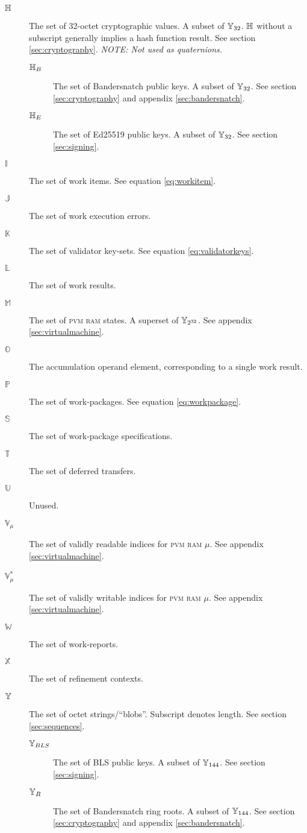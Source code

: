 \begin{description}
  \item[$\mathbb{H}$] The set of 32-octet cryptographic values. A subset of $\mathbb{Y}_{32}$. $\mathbb{H}$ without a subscript generally implies a hash function result. See section \ref{sec:cryptography}. \emph{NOTE: Not used as quaternions.}
  \begin{description}
    \item[$\mathbb{H}_B$] The set of Bandersnatch public keys. A subset of $\mathbb{Y}_{32}$. See section \ref{sec:cryptography} and appendix \ref{sec:bandersnatch}.
    \item[$\mathbb{H}_E$] The set of Ed25519 public keys. A subset of $\mathbb{Y}_{32}$. See section \ref{sec:signing}.
  \end{description}
  \item[$\mathbb{I}$] The set of work items. See equation \ref{eq:workitem}.
  \item[$\mathbb{J}$] The set of work execution errors.
  \item[$\mathbb{K}$] The set of validator key-sets. See equation \ref{eq:validatorkeys}.
  \item[$\mathbb{L}$] The set of work results.
  \item[$\mathbb{M}$] The set of \textsc{pvm} \textsc{ram} states. A superset of $\mathbb{Y}_{2^{32}}$. See appendix \ref{sec:virtualmachine}.
  \item[$\mathbb{O}$] The accumulation operand element, corresponding to a single work result.
  \item[$\mathbb{P}$] The set of work-packages. See equation \ref{eq:workpackage}.
  \item[$\mathbb{S}$] The set of work-package specifications.
  \item[$\mathbb{T}$] The set of deferred transfers.
  \item[$\mathbb{U}$] Unused.
  \item[$\mathbb{V}_{\mu}$] The set of validly readable indices for \textsc{pvm} \textsc{ram} $\mu$. See appendix \ref{sec:virtualmachine}.
  \item[$\mathbb{V}^*_{\mu}$] The set of validly writable indices for \textsc{pvm} \textsc{ram} $\mu$. See appendix \ref{sec:virtualmachine}.
  \item[$\mathbb{W}$] The set of work-reports.
  \item[$\mathbb{X}$] The set of refinement contexts.
  \item[$\mathbb{Y}$] The set of octet strings/``blobs''. Subscript denotes length. See section \ref{sec:sequences}.
  \begin{description}
    \item[$\mathbb{Y}_{BLS}$] The set of BLS public keys. A subset of $\mathbb{Y}_{144}$. See section \ref{sec:signing}.
    \item[$\mathbb{Y}_R$] The set of Bandersnatch ring roots. A subset of $\mathbb{Y}_{144}$. See section \ref{sec:cryptography} and appendix \ref{sec:bandersnatch}.
  \end{description}
\end{description}

